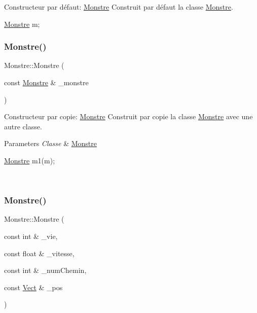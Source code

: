 Constructeur par défaut\+: \hyperlink{classMonstre}{Monstre} Construit par défaut la classe \hyperlink{classMonstre}{Monstre}. 


\begin{DoxyCode}
\hyperlink{classMonstre}{Monstre} m;
\end{DoxyCode}
 \mbox{\label{classMonstre_a9097846a3f136f6db0a51b80a3ccc15d}} 
\subsubsection{\texorpdfstring{Monstre()}{Monstre()}\hspace{0.1cm}{\footnotesize\ttfamily [2/3]}}
{\footnotesize\ttfamily Monstre\+::\+Monstre (\begin{DoxyParamCaption}\item[{const \hyperlink{classMonstre}{Monstre} \&}]{\+\_\+monstre }\end{DoxyParamCaption})}



Constructeur par copie\+: \hyperlink{classMonstre}{Monstre} Construit par copie la classe \hyperlink{classMonstre}{Monstre} avec une autre classe. 


\begin{DoxyParams}{Parameters}
{\em Classe} & \hyperlink{classMonstre}{Monstre} 
\begin{DoxyCode}
\hyperlink{classMonstre}{Monstre} m1(m);
\end{DoxyCode}
 \\
\hline
\end{DoxyParams}
\mbox{\label{classMonstre_aa413ee7bcdcd31bcf5957110c0d31b8a}} 
\subsubsection{\texorpdfstring{Monstre()}{Monstre()}\hspace{0.1cm}{\footnotesize\ttfamily [3/3]}}
{\footnotesize\ttfamily Monstre\+::\+Monstre (\begin{DoxyParamCaption}\item[{const int \&}]{\+\_\+vie,  }\item[{const float \&}]{\+\_\+vitesse,  }\item[{const int \&}]{\+\_\+num\+Chemin,  }\item[{const \hyperlink{classVect}{Vect} \&}]{\+\_\+pos }\end{DoxyParamCaption})}



